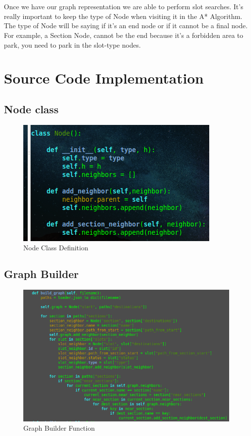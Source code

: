 \paragraph{} ~\\
Once we have our graph representation we are able to perform slot searches. It's really important to keep the type of Node when visiting it in the A* Algorithm. The type 
of Node will be saying if it's an end node or if it cannot be a final node. For example, a Section Node, cannot be the end because it's a forbidden area to park, you 
need to park in the slot-type nodes.

\section{Source Code Implementation}

\subsection{Node class}
\begin{figure}[H]
    \centering
    \includegraphics[width=.7\textwidth]{images/node_class.png}
    \caption{Node Class Definition}
    \label{fig:node_class}
\end{figure}

\subsection{Graph Builder}
\begin{figure}[H]
    \centering
    \includegraphics[width=1\textwidth]{images/graph_builder.png}
    \caption{Graph Builder Function}
    \label{fig:graph_builder}
\end{figure}

